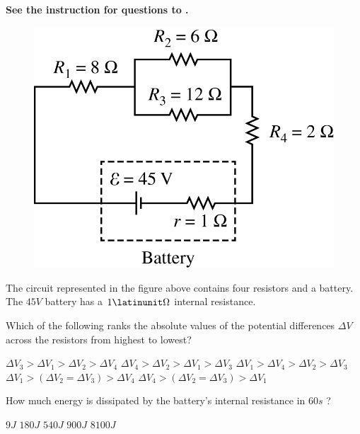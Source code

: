 \textbf{See the instruction for questions  to .}

\begin{figure}[H]
    \centering
    \includegraphics[scale=0.3]{images/img-011-026.png}
\end{figure}

The circuit represented in the figure above contains four resistors and a battery. The $45 \unit{V}$ battery has a $1 \latinunit\Omega$ internal resistance.

\begin{questions}\setcounter{question}{23}\question
Which of the following ranks the absolute values of the potential differences $\Delta V$ across the resistors from highest to lowest?

\begin{choices}
\choice $\Delta V_{3}>\Delta V_{1}>\Delta V_{2}>\Delta V_{4}$
\choice $\Delta V_{4}>\Delta V_{2}>\Delta V_{1}>\Delta V_{3}$
\choice $\Delta V_{1}>\Delta V_{4}>\Delta V_{2}>\Delta V_{3}$
\choice $\Delta V_{1}>\left(\Delta V_{2}=\Delta V_{3}\right)>\Delta V_{4}$
\choice $\Delta V_{4}>\left(\Delta V_{2}=\Delta V_{3}\right)>\Delta V_{1}$
\end{choices}\end{questions}

\begin{questions}\setcounter{question}{24}\question
How much energy is dissipated by the battery's internal resistance in $60 \unit{s}$ ?

\begin{oneparchoices}
\choice $9 \unit{J}$
\choice $180 \unit{J}$
\choice $540 \unit{J}$
\choice $900 \unit{J}$
\choice $8100 \unit{J}$
\end{oneparchoices}\end{questions}
